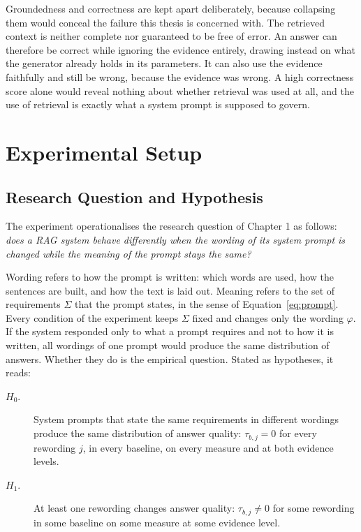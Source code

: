 \documentclass[12pt,a4paper,oneside]{scrreprt}
\begin{document}
Groundedness and correctness are kept apart deliberately, because collapsing them would conceal the failure this thesis is concerned with. The retrieved context is neither complete nor guaranteed to be free of error. An answer can therefore be correct while ignoring the evidence entirely, drawing instead on what the generator already holds in its parameters. It can also use the evidence faithfully and still be wrong, because the evidence was wrong. A high correctness score alone would reveal nothing about whether retrieval was used at all, and the use of retrieval is exactly what a system prompt is supposed to govern.

\chapter{Experimental Setup}
 
\section{Research Question and Hypothesis}
\label{sec:goal}

The experiment operationalises the research question of Chapter 1 as follows: \textit{does a RAG system behave differently when the wording of its system prompt is changed while the meaning of the prompt stays the same?}

Wording refers to how the prompt is written: which words are used, how the sentences are built, and how the text is laid out. Meaning refers to the set of requirements $\Sigma$ that the prompt states, in the sense of Equation~\eqref{eq:prompt}. Every condition of the experiment keeps $\Sigma$ fixed and changes only the wording $\varphi$. If the system responded only to what a prompt requires and not to how it is written, all wordings of one prompt would produce the same distribution of answers. Whether they do is the empirical question. Stated as hypotheses, it reads:

\begin{description}
    \item[$H_0$.] System prompts that state the same requirements in different wordings produce the same distribution of answer quality: $\tau_{b,j} = 0$ for every rewording $j$, in every baseline, on every measure and at both evidence levels.
    \item[$H_1$.] At least one rewording changes answer quality: $\tau_{b,j} \neq 0$ for some rewording in some baseline on some measure at some evidence level.
\end{description}
\end{document}
